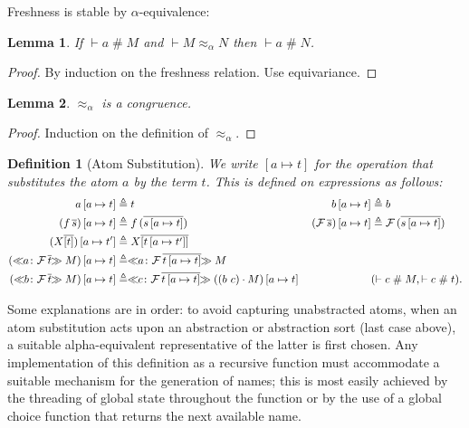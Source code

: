 \documentclass[11pt,a4paper]{amsart}
\newtheorem{definition}{Definition}
\newtheorem{lemma}{Lemma}
\newcounter{s}
\newcommand{\absterm}[2]{\ensuremath{\ll\!\!#1\!\!\gg #2}}
\newcommand{\concr}[2]{#1[#2]}
\newcommand{\vect}[1]{\ensuremath{\overline{#1}}}
\newcommand{\sconstr}[2]{\ensuremath{#1\,#2}}
\newcommand{\ofType}{\colon}
\newcommand {\act}      [0] {\cdot}
\newcommand {\prmAct}   [2] {#1 \act #2}
\newcommand {\aSubAct} [2] {#1 \, #2}
\newcommand{\varTrmD} [3] {\ensuremath{#3}} %
\newcommand {\absTrmD}  [3] {\absterm{#1 \ofType #2} #3}
\newcommand {\appTrm}  [2] {\sconstr{#1}{#2}}
\newcommand {\susp}    [2] {\ifthenelse{\isempty{#1}}
                                       {\ifthenelse{\isempty{#2}}{}{#2}}
                                       {\ifthenelse{\isempty{#2}}{#1}{#1  | #2}}}
\newcommand {\cent}     [0] {\vdash}
\newcommand {\hsh}      [0] {\#}
\newcommand {\frsh}    [0] {\mathrel{\hsh}}
\newcommand {\trans}    [2] {(#1 \ #2)}
\newcommand {\al}       [0] {{\approx_\alpha}}
\newcommand {\aleq}     [0] {\mathrel{\al}}
\newcommand {\joinTsubs} [2] {#1 \circ #2}
\begin{document}
\noindent Freshness is stable by $\alpha$-equivalence:
\begin{lemma}
If $\cent a \frsh M$ and $\cent M \aleq N$ then $\cent a \frsh N$.
\end{lemma}

\begin{proof}
By induction on the freshness relation. Use equivariance.
\end{proof}
\begin{lemma}
$\aleq$ is a congruence.
\end{lemma}
\begin{proof}
    Induction on the definition of $\aleq$.
\end{proof}

\newcommand{\asubs}[2]{\ensuremath{[#1 \mapsto #2]}}

\begin{definition}[Atom Substitution]
\label{dependent:atom_substitution}
We write \asubs{a}{t} for the operation that substitutes the atom $a$ by the term $t$. This is defined on expressions as follows:
\begin{alignat*}{2}
\aSubAct{a}{\asubs{a}{t}} & \triangleq  t & \qquad
\aSubAct{b}{\asubs{a}{t}} & \triangleq  b \\
\aSubAct{(\appTrm{f}{\vect{s}})}{\asubs{a}{t}} & \triangleq  \appTrm{f}{(\vect{\aSubAct{s}{\asubs{a}{t}}})} &
\aSubAct{(\appTrm{\mathcal{F}}{\vect{s}})}{\asubs{a}{t}} & \triangleq  \appTrm{\mathcal{F}}{(\vect{\aSubAct{s}{\asubs{a}{t}}})} \\
\aSubAct{(\varTrmD{\asubs{a}{t}}{\pi}{X} \vect{\concr{}{t}})}{\asubs{a}{t'}} & \triangleq \varTrmD{(\joinTsubs{\vartheta'}{\vartheta})}{\pi}{X} \vect{\concr{}{\aSubAct{t}{\asubs{a}{t'}}}} &  & \\
\aSubAct{(\absTrmD{a}{\sconstr{\mathcal{F}}{\vect{t}}}{M})}{\asubs{a}{t}} & \triangleq \absTrmD{a}{\sconstr{\mathcal{F}}{\vect{\aSubAct{t}{\asubs{a}{t}}}}}{M}  &   \\
\aSubAct{(\absTrmD{b}{\sconstr{\mathcal{F}}{\vect{t}}}{M})}{\asubs{a}{t}} & \triangleq \absTrmD{c}{\sconstr{\mathcal{F}}{\vect{\aSubAct{t}{\asubs{a}{t}}}}}{\aSubAct{(\prmAct{\trans{b}{c}}{M})}{\asubs{a}{t}}}  &  & (\cent c \frsh M, \cent c \frsh t)  . 
\end{alignat*}
\end{definition}

Some explanations are in order: 
to avoid capturing unabstracted atoms,  when an atom substitution acts upon an abstraction or abstraction sort (last case above),
a suitable alpha-equivalent representative of the latter is first chosen.
Any implementation of this definition as a recursive function must accommodate a suitable mechanism for the generation of names; this is most easily achieved by the threading of global state throughout the function or by the use of a global choice function that returns the next available name.\\
\end{document}
